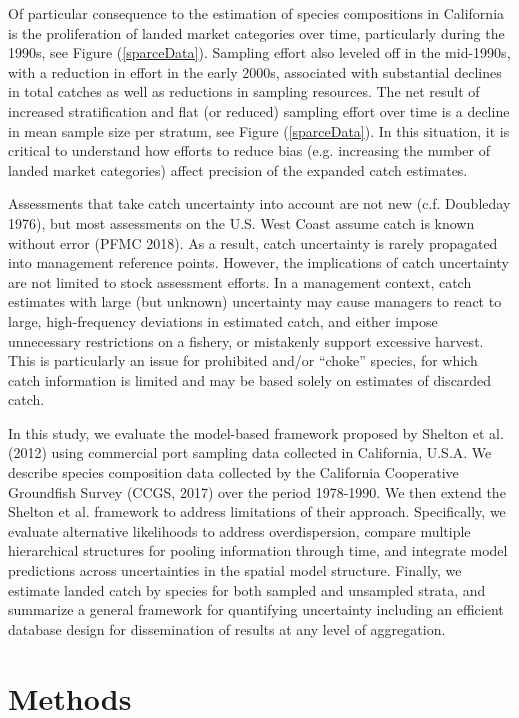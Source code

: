 \documentclass[12pt]{article}
\begin{document}
Of particular consequence to the estimation of species compositions in 
California is the proliferation of landed market categories over time, 
particularly during the 1990s, see Figure (\ref{sparceData}). Sampling effort 
also leveled off in the mid-1990s, with a reduction in effort in the early 
2000s, associated with substantial declines in total catches as well as 
reductions in sampling resources. The net result of increased stratification 
and flat (or reduced) sampling effort over time is a decline in mean sample 
size per stratum, see Figure (\ref{sparceData}). In this situation, it is 
critical to understand how efforts to reduce bias (e.g. increasing the number 
of landed market categories) affect precision of the expanded catch estimates.

Assessments that take catch uncertainty into account are not new (c.f.
Doubleday 1976), but most assessments on the U.S. West Coast assume
catch is known without error (PFMC 2018). As a result, catch uncertainty
is rarely propagated into management reference points. However, the
implications of catch uncertainty are not limited to stock assessment
efforts. In a management context, catch estimates with large (but
unknown) uncertainty may cause managers to react to large,
high-frequency deviations in estimated catch, and either impose
unnecessary restrictions on a fishery, or mistakenly support excessive
harvest. This is particularly an issue for prohibited and/or ``choke''
species, for which catch information is limited and may be based solely on
estimates of discarded catch.

In this study, we evaluate the model-based framework proposed by Shelton
et al. (2012) using commercial port sampling data collected in
California, U.S.A. We describe species composition data collected by the
California Cooperative Groundfish Survey (CCGS, 2017) over the period
1978-1990. We then extend the Shelton et al. framework to address
limitations of their approach. Specifically, we evaluate alternative
likelihoods to address overdispersion, compare multiple hierarchical
structures for pooling information through time, and integrate model
predictions across uncertainties in the spatial model structure.
Finally, we estimate landed catch by species for both sampled and
unsampled strata, and summarize a general framework for quantifying
uncertainty including an efficient database design for dissemination of
results at any level of aggregation.

%
%
\section{Methods}\label{methods}
%
%
\end{document}
